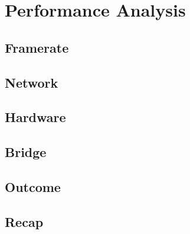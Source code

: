 \chapter{Performance Analysis}\label{ch:performance}

\section{Framerate}\label{sc:performance:framerate}

\section{Network}\label{sc:performance:network}

\section{Hardware}\label{sc:performance:hardware}

\section{Bridge}\label{sc:performance:bridge}

\section{Outcome}\label{sc:performance:outcome}

\section{Recap}\label{sc:performance:recap}
